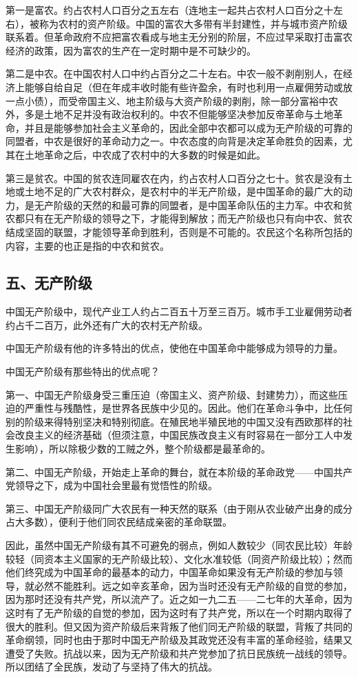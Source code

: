 第一是富农。约占农村人口百分之五左右（连地主一起共占农村人口百分之十左右），被称为农村的资产阶级。中国的富农大多带有半封建性，并与城市资产阶级联系着。但革命政府不应把富农看成与地主无分别的阶层，不应过早采取打击富农经济的政策，因为富农的生产在一定时期中是不可缺少的。

第二是中农。在中国农村人口中约占百分之二十左右。中农一般不剥削别人，在经济上能够自给自足（但在年成丰收时能有些许盈余，有时也利用一点雇佣劳动或放一点小债），而受帝国主义、地主阶级与大资产阶级的剥削，除一部分富裕中农外，多是土地不足并没有政治权利的。中农不但能够坚决参加反帝革命与土地革命，并且是能够参加社会主义革命的，因此全部中农都可以成为无产阶级的可靠的同盟者，中农是很好的革命动力之一。中农态度的向背是决定革命胜负的因素，尤其在土地革命之后，中农成了农村中的大多数的时候是如此。

第三是贫农。中国的贫农连同雇农在内，约占农村人口百分之七十。贫农是没有土地或土地不足的广大农村群众，是农村中的半无产阶级，是中国革命的最广大的动力，是无产阶级的天然的和最可靠的同盟者，是中国革命队伍的主力军。中农和贫农都只有在无产阶级的领导之下，才能得到解放；而无产阶级也只有向中农、贫农结成坚固的联盟，才能领导革命到胜利，否则是不可能的。农民这个名称所包括的内容，主要的也正是指的中农和贫农。

\subsection{五、无产阶级}

中国无产阶级中，现代产业工人约占二百五十万至三百万。城市手工业雇佣劳动者约占千二百万，此外还有广大的农村无产阶级。

中国无产阶级有他的许多特出的优点，使他在中国革命中能够成为领导的力量。

中国无产阶级有那些特出的优点呢？

第一、中国无产阶级身受三重压迫（帝国主义、资产阶级、封建势力），而这些压迫的严重性与残酷性，是世界各民族中少见的。因此。他们在革命斗争中，比任何别的阶级来得特别坚决和特别彻底。在殖民地半殖民地的中国又没有西欧那样的社会改良主义的经济基础（但须注意，中国民族改良主义有时容易在一部分工人中发生影响），所以除极少数的工贼之外，整个阶级都是最革命的。

第二、中国无产阶级，开始走上革命的舞台，就在本阶级的革命政党——中国共产党领导之下，成为中国社会里最有觉悟性的阶级。

第三、中国无产阶级同广大农民有一种天然的联系（由于刚从农业破产出身的成分占大多数），便利于他们同农民结成亲密的革命联盟。

因此，虽然中国无产阶级有其不可避免的弱点，例如人数较少（同农民比较）年龄较轻（同资本主义国家的无产阶级比较）、文化水准较低（同资产阶级比较）；然而他们终究成为中国革命的最基本的动力，中国革命如果没有无产阶级的参加与领导，就必然不能胜利。远之如辛亥革命，因为当时还没有无产阶级的自觉的参加，因为那时还没有共产党，所以流产了。近之如一九二五——二七年的大革命，因为这时有了无产阶级的自觉的参加，因为这时有了共产党，所以在一个时期内取得了很大的胜利。但又因为资产阶级后来背叛了他们同无产阶级的联盟，背叛了共同的革命纲领，同时也由于那时中国无产阶级及其政党还没有丰富的革命经验，结果又遭受了失败。抗战以来，因为无产阶级和共产党参加了抗日民族统一战线的领导。所以团结了全民族，发动了与坚持了伟大的抗战。

